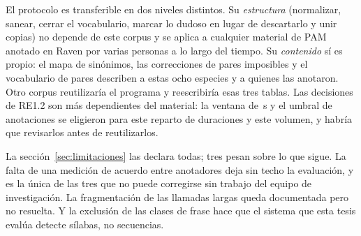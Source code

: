  El protocolo es transferible en dos niveles distintos.
Su \emph{estructura} (normalizar, sanear, cerrar el vocabulario, marcar lo dudoso
en lugar de descartarlo y unir copias) no depende de este corpus y se aplica a
cualquier material de PAM anotado en Raven por varias personas a lo largo del
tiempo. Su \emph{contenido} sí es propio: el mapa de sinónimos, las correcciones
de pares imposibles y el vocabulario de \nVocab{} pares describen a estas ocho
especies y a quienes las anotaron. Otro corpus reutilizaría el programa y
reescribiría esas tres tablas. Las decisiones de RE1.2 son más dependientes del
material: la ventana de \clipLen{}\,s y el umbral de \minPairCount{} anotaciones
se eligieron para este reparto de duraciones y este volumen, y habría que
revisarlos antes de reutilizarlos.

 La sección~\ref{sec:limitaciones} las declara todas; tres
pesan sobre lo que sigue. La falta de una medición de acuerdo entre anotadores
deja sin techo la evaluación, y es la única de las tres que no puede corregirse
sin trabajo del equipo de investigación. La fragmentación de las llamadas largas
queda documentada pero no resuelta. Y la exclusión de las clases de frase hace
que el sistema que esta tesis evalúa detecte sílabas, no secuencias.
